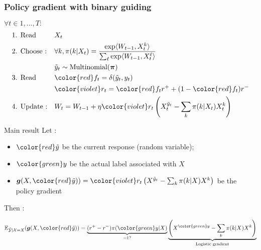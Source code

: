 \documentclass{beamer}
\begin{document}
\begin{frame}\frametitle{Policy gradient {\color{red} with binary guiding}}
	\begin{block}{}
		$\forall t \in 1,...,T :$
		\begin{align*}
		&\text{1. Read } 
		&& X_t 
		\\
		&\text{2. Choose :} 
		&& \forall k, \pi(k|X_t) = \frac{\exp\langle W_{t-1}, X_t^k\rangle}{\sum_{\ell}\exp\langle W_{t-1}, X_t^\ell\rangle}
		\\
		&
		&& \tilde{y}_t \sim \text{Multinomial}(\boldsymbol{\pi})
		\\
		&\text{3. Read } 
		&& {\color{red} f_t = \delta(\tilde{y}_t ,y_t)} 
		\\
		&
		&& {\color{violet}r_t} =  {\color{red} f_t} r^+ +(1-{\color{red} f_t}) r^-
		\\
		&\text{4. Update :} 
		&& W_t = W_{t-1} + \eta {\color{violet}r_t} \left(X_t^{\tilde{y}_t} - \sum_k \pi(k|X_t) X_t^k \right) 
		\end{align*}
	\end{block}	
	
\end{frame}

\begin{frame}{Main result}
	Let :
	\begin{itemize}
		\item ${\color{red}\tilde{y}}$ be the current response (random variable);
		\item ${\color{green}y}$ be the actual label associated with $X$
		\item $\boldsymbol{g}(X,{\color{red}\tilde{y}})) = {\color{violet}r_t} \left(X^{\tilde{y}_t} - \sum_k \pi(k|X) X^k \right)$ be the policy gradient
	\end{itemize}
	Then :
	\begin{exampleblock}{}
$$\mathbb{E}_{\tilde{\mathcal{Y}}|\mathcal{X} = X}(\boldsymbol{g}(X,{\color{red}\tilde{y}})) = \underbrace {(r^+ - r^-) \pi({\color{green}y}|X)}_\text{=1?}
\underbrace{\left(X^{\color{green}y} - \sum_k  \pi(k|X) X^k \right)}_\text{Logistic gradient}$$
	\end{exampleblock}	
\end{frame}	
\end{document}
